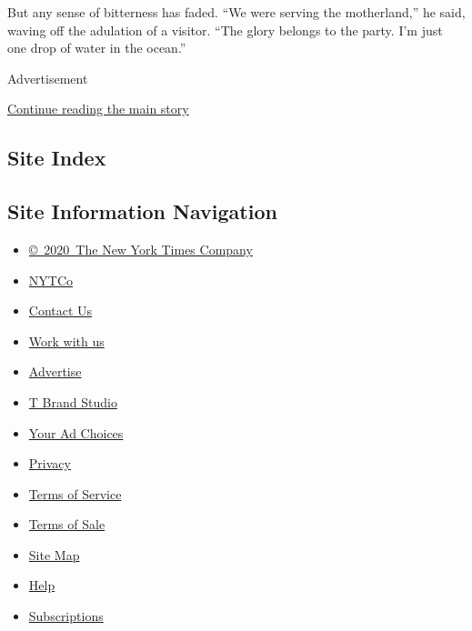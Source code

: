 But any sense of bitterness has faded. ``We were serving the
motherland,'' he said, waving off the adulation of a visitor. ``The
glory belongs to the party. I'm just one drop of water in the ocean.''

Advertisement

\protect\hyperlink{after-bottom}{Continue reading the main story}

\hypertarget{site-index}{%
\subsection{Site Index}\label{site-index}}

\hypertarget{site-information-navigation}{%
\subsection{Site Information
Navigation}\label{site-information-navigation}}

\begin{itemize}
\tightlist
\item
  \href{https://help.nytimes.com/hc/en-us/articles/115014792127-Copyright-notice}{©~2020~The
  New York Times Company}
\end{itemize}

\begin{itemize}
\tightlist
\item
  \href{https://www.nytco.com/}{NYTCo}
\item
  \href{https://help.nytimes.com/hc/en-us/articles/115015385887-Contact-Us}{Contact
  Us}
\item
  \href{https://www.nytco.com/careers/}{Work with us}
\item
  \href{https://nytmediakit.com/}{Advertise}
\item
  \href{http://www.tbrandstudio.com/}{T Brand Studio}
\item
  \href{https://www.nytimes.com/privacy/cookie-policy\#how-do-i-manage-trackers}{Your
  Ad Choices}
\item
  \href{https://www.nytimes.com/privacy}{Privacy}
\item
  \href{https://help.nytimes.com/hc/en-us/articles/115014893428-Terms-of-service}{Terms
  of Service}
\item
  \href{https://help.nytimes.com/hc/en-us/articles/115014893968-Terms-of-sale}{Terms
  of Sale}
\item
  \href{https://spiderbites.nytimes.com}{Site Map}
\item
  \href{https://help.nytimes.com/hc/en-us}{Help}
\item
  \href{https://www.nytimes.com/subscription?campaignId=37WXW}{Subscriptions}
\end{itemize}

